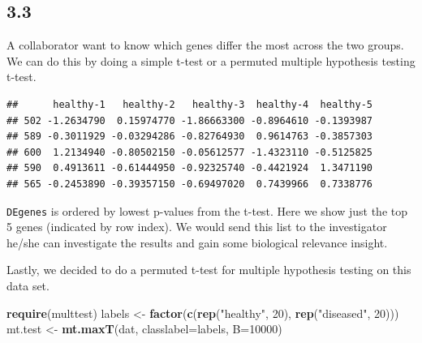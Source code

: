 \documentclass[]{article}
\newenvironment{Shaded}{\begin{snugshade}}{\end{snugshade}}
\newcommand{\KeywordTok}[1]{\textcolor[rgb]{0.13,0.29,0.53}{\textbf{{#1}}}}
\newcommand{\DataTypeTok}[1]{\textcolor[rgb]{0.13,0.29,0.53}{{#1}}}
\newcommand{\DecValTok}[1]{\textcolor[rgb]{0.00,0.00,0.81}{{#1}}}
\newcommand{\StringTok}[1]{\textcolor[rgb]{0.31,0.60,0.02}{{#1}}}
\newcommand{\NormalTok}[1]{{#1}}
\begin{document}
\subsection{3.3}\label{section}

A collaborator want to know which genes differ the most across the two
groups. We can do this by doing a simple t-test or a permuted multiple
hypothesis testing t-test.

\begin{Shaded}
\end{Shaded}

\begin{verbatim}
##      healthy-1   healthy-2   healthy-3  healthy-4  healthy-5
## 502 -1.2634790  0.15974770 -1.86663300 -0.8964610 -0.1393987
## 589 -0.3011929 -0.03294286 -0.82764930  0.9614763 -0.3857303
## 600  1.2134940 -0.80502150 -0.05612577 -1.4323110 -0.5125825
## 590  0.4913611 -0.61444950 -0.92325740 -0.4421924  1.3471190
## 565 -0.2453890 -0.39357150 -0.69497020  0.7439966  0.7338776
\end{verbatim}

\texttt{DEgenes} is ordered by lowest p-values from the t-test. Here we
show just the top 5 genes (indicated by row index). We would send this
list to the investigator he/she can investigate the results and gain
some biological relevance insight.

Lastly, we decided to do a permuted t-test for multiple hypothesis
testing on this data set.

\begin{Shaded}
\begin{Highlighting}[]
\KeywordTok{require}\NormalTok{(multtest)}
\NormalTok{labels <-}\StringTok{ }\KeywordTok{factor}\NormalTok{(}\KeywordTok{c}\NormalTok{(}\KeywordTok{rep}\NormalTok{(}\StringTok{"healthy"}\NormalTok{, }\DecValTok{20}\NormalTok{), }\KeywordTok{rep}\NormalTok{(}\StringTok{"diseased"}\NormalTok{, }\DecValTok{20}\NormalTok{)))}
\NormalTok{mt.test <-}\StringTok{ }\KeywordTok{mt.maxT}\NormalTok{(dat, }\DataTypeTok{classlabel=}\NormalTok{labels, }\DataTypeTok{B=}\DecValTok{10000}\NormalTok{)}
\end{Highlighting}
\end{Shaded}
\end{document}

